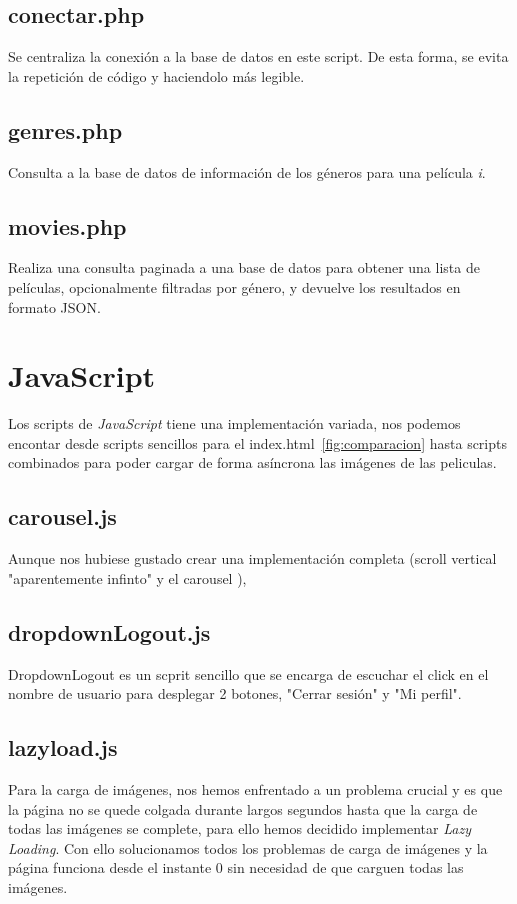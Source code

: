 \documentclass[a4paper, 12pt]{report}
\begin{document}
    \section{conectar.php}
    Se centraliza la conexión a la base de datos en este script. De esta forma, se evita la repetición de código y haciendolo más legible.
    \section{genres.php}
    Consulta a la base de datos de información de los géneros para una película \textit{i}.
    \section{movies.php}
    Realiza una consulta paginada a una base de datos para obtener una lista de películas, opcionalmente filtradas por género, y devuelve los resultados en formato JSON.

    \chapter{JavaScript}

    Los scripts de \textit{JavaScript} tiene una implementación variada, nos podemos encontar desde scripts sencillos para el index.html~\ref{fig:comparacion} hasta scripts combinados para poder cargar de forma asíncrona las imágenes de las peliculas.

    \section{carousel.js}
    Aunque nos hubiese gustado crear una implementación completa (scroll vertical "aparentemente infinto" y el carousel \cite{carousel}),
    \section{dropdownLogout.js}
    DropdownLogout es un scprit sencillo que se encarga de escuchar el click en el nombre de usuario para desplegar 2 botones, "Cerrar sesión" y "Mi perfil".
    \section{lazyload.js}
    Para la carga de imágenes, nos hemos enfrentado a un problema crucial y es que la página no se quede colgada durante largos segundos hasta que la carga de todas las imágenes se complete, para ello hemos decidido implementar \textit{Lazy Loading}\cite{lazyloading}. Con ello solucionamos todos los problemas de carga de imágenes y la página funciona desde el instante 0 sin necesidad de que carguen todas las imágenes.
\end{document}
